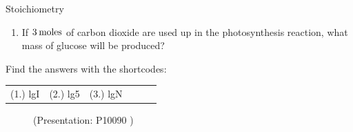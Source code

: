 \begin{exercises}{  Stoichiometry
      }
\begin{enumerate}[noitemsep, label=\textbf{\arabic*}. ]
\begin{enumerate}[noitemsep, label=\textbf{\alph*}. ]
\label{m38712*uid106}\item If $3\phantom{\rule{2pt}{0ex}}\text{moles}$ of carbon dioxide are used up in the photosynthesis reaction, what mass of glucose will be produced?
\end{enumerate}
                \end{enumerate}
 \label{m38712*cid10}
\par {} Find the answers with the shortcodes:
 \par \begin{tabular}[h]{cccccc}
 (1.) lgI  &  (2.) lg5  &  (3.) lgN  & \end{tabular}
\end{exercises}

    \label{m38712*eip-269} 
    \setcounter{subfigure}{0}
	\begin{figure}[H] %
    \label{m38712*slidesharemedia}\label{m38712*slideshareflash}
             { (Presentation:  P10090 )}
 \end{figure}       \par

